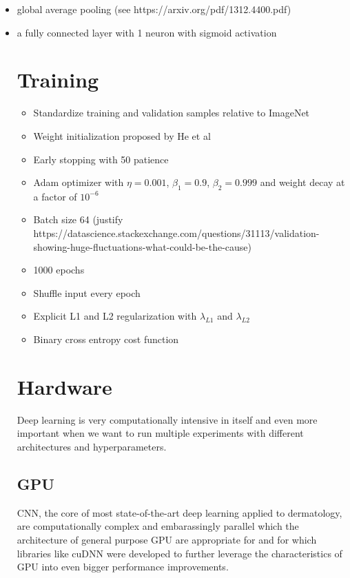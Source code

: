 \begin{itemize}
    \item global average pooling (see https://arxiv.org/pdf/1312.4400.pdf)
    \item a fully connected layer with 1 neuron with sigmoid activation

\section{Training}

\begin{itemize}
    \item Standardize training and validation samples relative to ImageNet
    \item Weight initialization proposed by He et al \cite{HeWeightInit}
    \item Early stopping with 50 patience
    \item Adam optimizer with $\eta = 0.001$, $\beta_1 = 0.9$, $\beta_2 = 0.999$ and weight decay at a factor of $10^{-6}$
    \item Batch size 64 (justify https://datascience.stackexchange.com/questions/31113/validation-showing-huge-fluctuations-what-could-be-the-cause)
    \item 1000 epochs
    \item Shuffle input every epoch
    \item Explicit L1 and L2 regularization with $\lambda_{L1}$ and $\lambda_{L2}$
    \item Binary cross entropy cost function
\end{itemize}

\section{Hardware}

Deep learning is very computationally intensive in itself and even more important when we want to run multiple experiments with different architectures and hyperparameters.

\subsection{GPU}
\ac{CNN}, the core of most state-of-the-art deep learning applied to dermatology, are computationally complex and embarassingly parallel \cite{chang2017} which the architecture of general purpose \ac{GPU} are appropriate for \cite{gpu} and for which libraries like cuDNN \cite{cudnn} were developed to further leverage the characteristics of \ac{GPU} into even bigger performance improvements.


\end{itemize}
